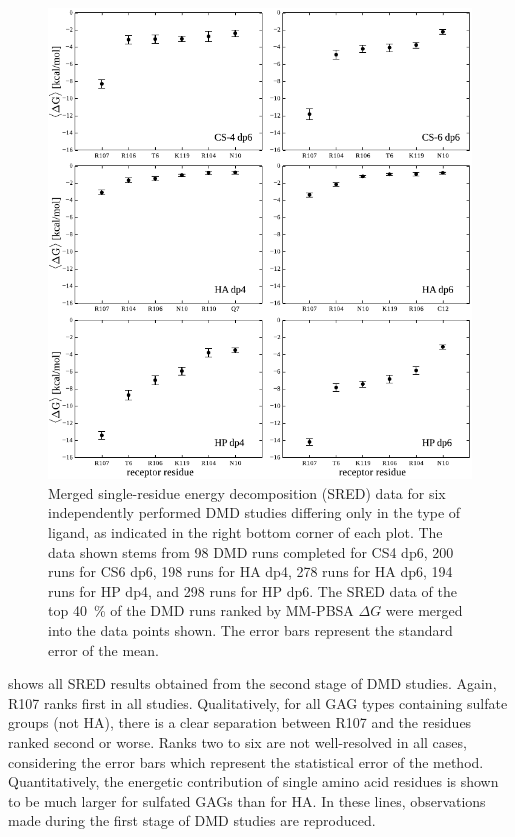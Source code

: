 \begin{figure}
\centering
\includegraphics[width=1.0\textwidth]{gfx/dmdil10/second_stage_all_SREDs_05.pdf}
\caption[]{
Merged single-residue energy decomposition (SRED) data for six independently
performed DMD studies differing only in the type of ligand, as indicated in the
right bottom corner of each plot. The data shown stems from 98 DMD runs
completed for CS4 dp6, 200 runs for CS6 dp6, 198 runs for HA dp4, 278 runs for
HA dp6, 194 runs for HP dp4, and 298 runs for HP dp6. The SRED data of the top
\SI{40}{\percent} of the DMD runs ranked by MM-PBSA $\Delta G$ were merged into
the data points shown. The error bars represent the standard error of the mean.
}
\label{fig:dmdil10:2nd_stage_all_SREDs}
\end{figure}

 shows all SRED results obtained from the
second stage of DMD studies. Again, R107 ranks first in all studies.
Qualitatively, for all GAG types containing sulfate groups (not HA), there is a
clear separation between R107 and the residues ranked second or worse. Ranks two
to six are not well-resolved in all cases, considering the error bars which
represent the statistical error of the method. Quantitatively, the energetic
contribution of single amino acid residues is shown to be much larger for
sulfated GAGs than for HA. In these lines, observations made during the first
stage of DMD studies are reproduced.

